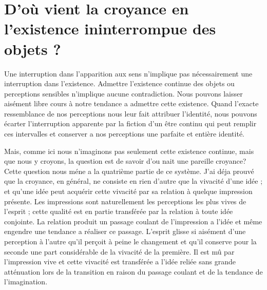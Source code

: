 
\section{D'où vient la croyance en l'existence ininterrompue des objets ?}

Une interruption dans l’apparition aux sens n’implique
pas nécessairement une interruption dans l'existence.
Admettre l’existence continue des objets ou perceptions
sensibles n’implique aucune contradiction. Nous pouvons
laisser aisément libre cours à notre tendance a admettre
cette existence. Quand l'exacte ressemblance de nos
perceptions nous leur fait attribuer l’identité, nous pouvons
écarter l’interruption apparente par la fiction d’un
être continu qui peut remplir ces intervalles et conserver
a nos perceptions une parfaite et entière identité.

Mais, comme ici nous n’imaginons pas seulement cette
existence continue, mais que nous y croyons, la question
est de savoir d’ou nait une pareille croyance? Cette
question nous méne a la quatrième partie de ce système.
J’ai déja prouvé que la croyance, en général, ne consiste
en rien d’autre que la vivacité d’une idée ; et qu’une idée
peut acquérir cette vivacité par sa relation à quelque
impression présente. Les impressions sont naturellement
les perceptions les plus vives de l’esprit ; cette qualité est
en partie transférée par la relation à toute idée conjointe.
La relation produit un passage coulant de l’impression a
l'idée et même engendre une tendance a réaliser ce passage.
L’esprit glisse si aisément d’une perception à l’autre
qu’il perçoit à peine le changement et qu’il conserve pour
la seconde une part considérable de la vivacité de la
première. Il est mû par l’impression vive et cette vivacité
est transférée a l’idée reliée sans grande atténuation lors
de la transition en raison du passage coulant et de la
tendance de l’imagination.


